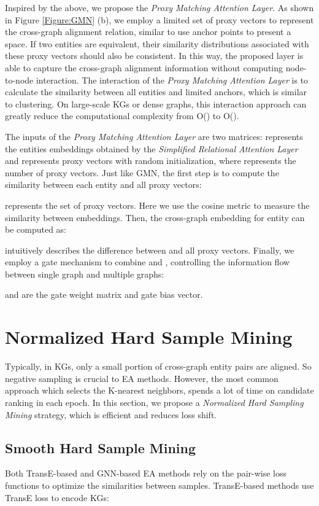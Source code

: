 \documentclass[sigconf]{acmart}
\begin{document}
Inspired by the above, we propose the \emph{Proxy Matching Attention Layer}.
As shown in Figure \ref{Figure:GMN} (b), we employ a limited set of proxy vectors to represent the cross-graph alignment relation, similar to use anchor points to present a space.
If two entities are equivalent, their similarity distributions associated with these proxy vectors should also be consistent.
In this way, the proposed layer is able to capture the cross-graph alignment information without computing node-to-node interaction.
The interaction of the \emph{Proxy Matching Attention Layer} is to calculate the similarity between all entities and limited anchors, which is similar to clustering.
On large-scale KGs or dense graphs, this interaction approach can greatly reduce the computational complexity from O() to O().

The inputs of the \emph{Proxy Matching Attention Layer} are two matrices:  represents the entities embeddings obtained by the \emph{Simplified Relational Attention Layer} and  represents proxy vectors with random initialization, where  represents the number of proxy vectors.
Just like GMN, the first step is to compute the similarity between each entity and all proxy vectors:

 represents the set of proxy vectors.
Here we use the cosine metric to measure the similarity between embeddings.
Then, the cross-graph embedding for entity  can be computed as:

 intuitively describes the difference between  and all proxy vectors.
Finally, we employ a gate mechanism \cite{DBLP:journals/corr/SrivastavaGS15} to combine  and , controlling the information flow between single graph and multiple graphs:




 and  are the gate weight matrix and gate bias vector.


\section{Normalized Hard Sample Mining}
Typically, in KGs, only a small portion of cross-graph entity pairs are aligned.
So negative sampling is crucial to EA methods.
However, the most common approach which selects the K-nearest neighbors, spends a lot of time on candidate ranking in each epoch.
In this section, we propose a \emph{Normalized Hard Sampling Mining} strategy, which is efficient and reduces loss shift.

\subsection{Smooth Hard Sample Mining}
Both TransE-based and GNN-based EA methods rely on the pair-wise loss functions to optimize the similarities between samples.
TransE-based methods use TransE loss to encode KGs:
\end{document}
